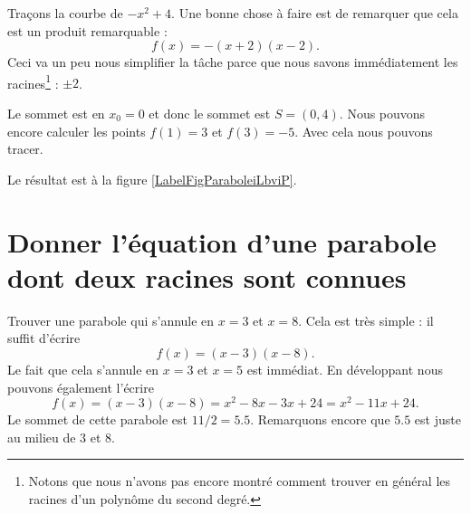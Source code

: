 \begin{example}
    Traçons la courbe de \( -x^2+4\). Une bonne chose à faire est de remarquer que cela est un produit remarquable :
    \begin{equation}
        f(x)=-(x+2)(x-2).
    \end{equation}
    Ceci va un peu nous simplifier la tâche parce que nous savons immédiatement les racines\footnote{Notons que nous n'avons pas encore montré comment trouver en général les racines d'un polynôme du second degré.} : \( \pm2\).

    Le sommet est en \( x_0=0\) et donc le sommet est \( S=(0,4)\). Nous pouvons encore calculer les points \( f(1)=3\) et \( f(3)=-5\). Avec cela nous pouvons tracer.

Le résultat est à la figure \ref{LabelFigParaboleiLbviP}.
\newcommand{\CaptionFigParaboleiLbviP}{La courbe de \( -x^2+4=-(x+2)(x-2)\).}


\end{example}


\section{Donner l'équation d'une parabole dont deux racines sont connues}

\begin{example}
    Trouver une parabole qui s'annule en \( x=3\) et \( x=8\). Cela est très simple : il suffit d'écrire
    \begin{equation}
        f(x)=(x-3)(x-8).
    \end{equation}
    Le fait que cela s'annule en \( x=3\) et \( x=5\) est immédiat. En développant nous pouvons également l'écrire
    \begin{equation}
        f(x)=(x-3)(x-8)=x^2-8x-3x+24=x^2-11x+24.
    \end{equation}
    Le sommet de cette parabole est \( 11/2=5.5\). Remarquons encore que \( 5.5\) est juste au milieu de \( 3\) et \( 8\).
\end{example}

